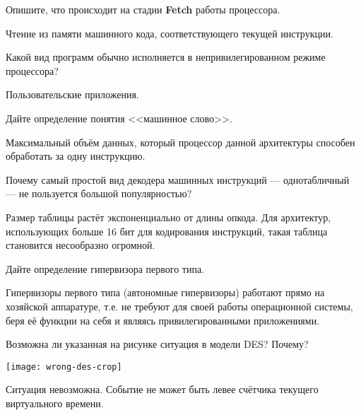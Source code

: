 \documentclass[a4paper, addpoints, answers]{exam}
\begin{document}
\begin{questions}
\question[3] Опишите, что происходит на стадии \textbf{Fetch} работы процессора.
\begin{solution}[1cm]
Чтение из памяти машинного кода, соответствующего текущей инструкции.
\end{solution}


\question[3] Какой вид программ обычно исполняется в непривилегированном режиме процессора?
\begin{solution}[1cm]
Пользовательские приложения.
\end{solution}

\question[3] Дайте определение понятия <<машинное слово>>.
\begin{solution}[1cm]
Максимальный объём данных, который процессор данной архитектуры способен обработать за одну инструкцию. 
\end{solution}

\question[3] Почему самый простой вид декодера машинных инструкций --- однотабличный --- не пользуется большой популярностью?
\begin{solution}[1cm]
    Размер таблицы растёт экспоненциально от длины опкода. Для архитектур, использующих больше 16 бит для кодирования инструкций, такая таблица становится несообразно огромной.
\end{solution}

\question[3] Дайте определение гипервизора первого типа.
\begin{solution}[2cm]
Гипервизоры первого типа (автономные гипервизоры) работают прямо на хозяйской аппаратуре, т.е. не требуют для своей работы операционной системы, беря её функции на себя и являясь привилегированными приложениями.
\end{solution}


\question[3] Возможна ли указанная на рисунке ситуация в модели DES? Почему?
\begin{center}
\texttt{[image: wrong-des-crop]}
\end{center}
\begin{solution}[1cm]
Ситуация невозможна. Событие не может быть левее счётчика текущего виртуального времени.
\end{solution}


\end{questions}
\end{document}
